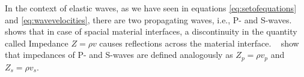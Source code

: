 In the context of elastic waves, as we have seen in equations \ref{eq:setofequations} and \ref{eq:wavevelocities}, there are two propagating waves, i.e., P- and S-waves. 
~\parencite[Sec 9.6-Sec 9.8]{leveque_2002} shows that in case of spacial material interfaces, a discontinuity in the quantity called Impedance $Z = \rho v$
causes reflections across the material interface. ~\parencite[Eq. 1.66 and 1.180]{kaufman} show that impedances of P- and S-waves are defined analogously as
$Z_p = \rho v_p$ and $Z_s = \rho v_s$.